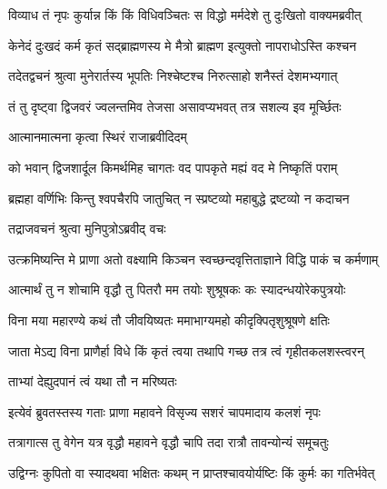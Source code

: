 \twolineshloka
{विव्याध तं नृपः कुर्यान्न किं किं विधिवञ्चितः}
{स विद्धो मर्मदेशे तु दुःखितो वाक्यमब्रवीत्} %



\twolineshloka
{केनेदं दुःखदं कर्म कृतं सद्ब्राह्मणस्य मे}
{मैत्रो ब्राह्मण इत्युक्तो नापराधोऽस्ति कश्चन} %



\twolineshloka
{तदेतद्वचनं श्रुत्वा मुनेरार्तस्य भूपतिः}
{निश्चेष्टश्च निरुत्साहो शनैस्तं देशमभ्यगात्} %

\twolineshloka
{तं तु दृष्ट्वा द्विजवरं ज्वलन्तमिव तेजसा}
{असावप्यभवत् तत्र सशल्य इव मूर्च्छितः} %

\onelineshloka
{आत्मानमात्मना कृत्वा स्थिरं राजाब्रवीदिदम्}%



\twolineshloka
{को भवान् द्विजशार्दूल किमर्थमिह चागतः}
{वद पापकृते मह्यं वद मे निष्कृतिं पराम्} %

\twolineshloka
{ब्रह्महा वर्णिभिः किन्तु श्वपचैरपि जातुचित्}
{न स्प्रष्टव्यो महाबुद्धे द्रष्टव्यो न कदाचन} %



\onelineshloka
{तद्राजवचनं श्रुत्वा मुनिपुत्रोऽब्रवीद् वचः}%



\twolineshloka
{उत्क्रमिष्यन्ति मे प्राणा अतो वक्ष्यामि किञ्चन}
{स्वच्छन्दवृत्तिताज्ञाने विद्धि पाकं च कर्मणाम्} %

\twolineshloka
{आत्मार्थं तु न शोचामि वृद्धौ तु पितरौ मम}
{तयोः शुश्रूषकः कः स्यादन्धयोरेकपुत्रयोः} %

\twolineshloka
{विना मया महारण्ये कथं तौ जीवयिष्यतः}
{ममाभाग्यमहो कीदृक्पितृशुश्रूषणे क्षतिः} %

\twolineshloka
{जाता मेऽद्य विना प्राणैर्हा विधे किं कृतं त्वया}
{तथापि गच्छ तत्र त्वं गृहीतकलशस्त्वरन्} %

\onelineshloka
{ताभ्यां देह्युदपानं त्वं यथा तौ न मरिष्यतः}%



\twolineshloka
{इत्येवं ब्रुवतस्तस्य गताः प्राणा महावने}
{विसृज्य सशरं चापमादाय कलशं नृपः} %

\twolineshloka
{तत्रागात्स तु वेगेन यत्र वृद्धौ महावने}
{वृद्धौ चापि तदा रात्रौ तावन्योन्यं समूचतुः} %



\twolineshloka
{उद्विग्नः कुपितो वा स्यादथवा भक्षितः कथम्}
{न प्राप्तश्चावयोर्यष्टिः किं कुर्मः का गतिर्भवेत्} %

